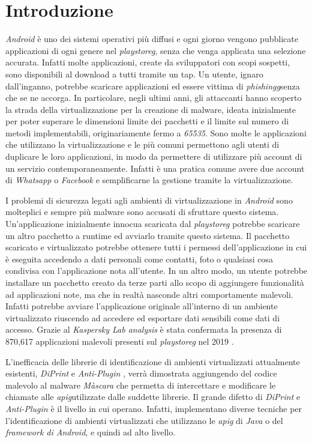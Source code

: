 \chapter{Introduzione}
\label{introduction}


\emph{Android} è uno dei sistemi operativi più diffusi e ogni giorno vengono pubblicate applicazioni di ogni genere nel \emph{\gls{playstoreg}}\glsfirstoccur, senza che venga applicata una selezione accurata. Infatti molte applicazioni, create da sviluppatori con scopi sospetti, sono disponibili al download a tutti tramite un tap. Un utente, ignaro dall'inganno, potrebbe scaricare applicazioni ed essere vittima di \emph{\gls{phishingg}}\glsfirstoccurspace  senza che se ne accorga. In particolare, negli ultimi anni, gli attaccanti hanno scoperto la strada della virtualizzazione per la creazione di malware, ideata inizialmente per poter superare le dimensioni limite dei pacchetti e il limite sul numero di metodi implementabili, originariamente fermo a \emph{65535}.
Sono molte le applicazioni che utilizzano la virtualizzazione e le più comuni permettono agli utenti di duplicare le loro applicazioni, in modo da permettere di utilizzare più account di un servizio contemporaneamente. Infatti è una pratica comune avere due account di \emph{Whatsapp} o \emph{Facebook} e semplificarne la gestione tramite la virtualizzazione.


I problemi di sicurezza legati agli ambienti di virtualizzazione in \emph{Android} sono molteplici e sempre più malware sono accusati di sfruttare questo sistema. Un'applicazione inizialmente innocua scaricata dal \emph{\gls{playstoreg}} potrebbe scaricare un altro pacchetto a runtime ed avviarlo tramite questo sistema. Il pacchetto scaricato e virtualizzato potrebbe ottenere tutti i permessi dell'applicazione in cui è eseguita accedendo a dati personali come contatti, foto o qualsiasi cosa condivisa con l'applicazione nota all'utente. In un altro modo, un utente potrebbe installare un pacchetto creato da terze parti allo scopo di aggiungere funzionalità ad applicazioni note, ma che in realtà nasconde altri comportamente malevoli. Infatti potrebbe avviare l'applicazione originale all'interno di un ambiente virtualizzato riuscendo ad accedere ed esportare dati sensibili come dati di accesso.
Grazie al \emph{Kaspersky Lab analysis} è stata confermata la presenza di 870,617 applicazioni malevoli presenti sul \emph{\gls{playstoreg}} nel 2019 \cite{KasperskyMalwareNumber}.

L'inefficacia delle librerie di identificazione di ambienti virtualizzati attualmente esistenti, \emph{DiPrint} \cite{DiPrint} e \emph{Anti-Plugin} \cite{Antiplugin}, verrà dimostrata aggiungendo del codice malevolo al malware \emph{Màscara} che permetta di intercettare e modificare le chiamate alle \emph{\gls{apig}}\glsfirstoccurspace utilizzate dalle suddette librerie.
Il grande difetto di \emph{DiPrint} e \emph{Anti-Plugin} è il livello in cui operano. Infatti, implementano diverse tecniche per l'identificazione di ambienti virtualizzati che utilizzano le \emph{\gls{apig}} di \emph{Java} o del \emph{framework di Android}, e quindi ad alto livello.

